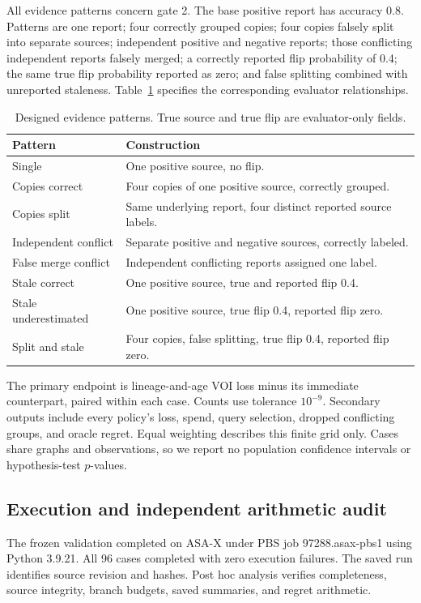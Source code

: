 \documentclass[manuscript,screen,nonacm]{acmart}
\begin{document}
All evidence patterns concern gate 2. The base positive report has accuracy 0.8. Patterns are one report; four correctly grouped copies; four copies falsely split into separate sources; independent positive and negative reports; those conflicting independent reports falsely merged; a correctly reported flip probability of 0.4; the same true flip probability reported as zero; and false splitting combined with unreported staleness. Table~\ref{tab:evidence} specifies the corresponding evaluator relationships.

\begin{table}[t]
\caption{Designed evidence patterns. True source and true flip are evaluator-only fields.}
\label{tab:evidence}
\begin{tabularx}{\linewidth}{lX}
\toprule
Pattern & Construction \\
\midrule
Single & One positive source, no flip. \\
Copies correct & Four copies of one positive source, correctly grouped. \\
Copies split & Same underlying report, four distinct reported source labels. \\
Independent conflict & Separate positive and negative sources, correctly labeled. \\
False merge conflict & Independent conflicting reports assigned one label. \\
Stale correct & One positive source, true and reported flip 0.4. \\
Stale underestimated & One positive source, true flip 0.4, reported flip zero. \\
Split and stale & Four copies, false splitting, true flip 0.4, reported flip zero. \\
\bottomrule
\end{tabularx}
\end{table}

The primary endpoint is lineage-and-age VOI loss minus its immediate counterpart, paired within each case. Counts use tolerance $10^{-9}$. Secondary outputs include every policy's loss, spend, query selection, dropped conflicting groups, and oracle regret. Equal weighting describes this finite grid only. Cases share graphs and observations, so we report no population confidence intervals or hypothesis-test $p$-values.

\subsection{Execution and independent arithmetic audit}
The frozen validation completed on ASA-X under PBS job 97288.asax-pbs1 using Python 3.9.21. All 96 cases completed with zero execution failures. The saved run identifies source revision and hashes. Post hoc analysis verifies completeness, source integrity, branch budgets, saved summaries, and regret arithmetic.
\end{document}
